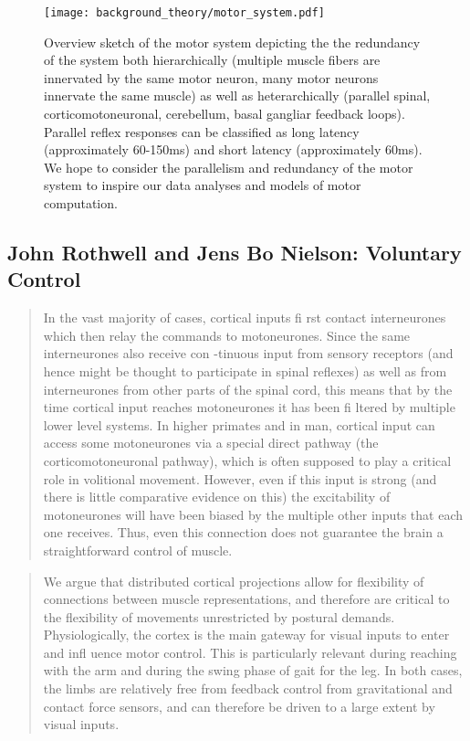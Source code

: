 \documentclass[../main.tex]{subfiles}
\begin{document}
\begin{figure}[H]
\centering
\texttt{[image: background\_theory/motor\_system.pdf]}
\caption[Motor sytem schematic]{Overview sketch of the motor system depicting the the redundancy of the system both hierarchically (multiple muscle fibers are innervated by the same motor neuron, many motor neurons innervate the same muscle) as well as heterarchically (parallel spinal, corticomotoneuronal, cerebellum, basal gangliar feedback loops). Parallel reflex responses can be classified as long latency (approximately 60-150ms) and short latency (approximately 60ms). We hope to consider the parallelism and redundancy of the motor system to inspire our data analyses and models of motor computation.}\label{fig:motor_system}
\end{figure}

\subsection{John Rothwell and Jens Bo Nielson: Voluntary Control}\label{john-rothwell-and-jens-bo-nielson-voluntary-control}

\begin{quote}
In the vast majority of cases, cortical inputs fi rst contact interneurones which then relay the commands to motoneurones. Since the same interneurones also receive con -tinuous input from sensory receptors (and hence might be thought to participate in spinal reflexes) as well as from interneurones from other parts of the spinal cord, this means that by the time cortical input reaches motoneurones it has been fi ltered by multiple lower level systems. In higher primates and in man, cortical input can access some motoneurones via a special direct pathway (the corticomotoneuronal pathway), which is often supposed to play a critical role in volitional movement. However, even if this input is strong (and there is little comparative evidence on this) the excitability of motoneurones will have been biased by the multiple other inputs that each one receives. Thus, even this connection does not guarantee the brain a straightforward control of muscle.
\end{quote}

\begin{quote}
We argue that distributed cortical projections allow for flexibility of connections between muscle representations, and therefore are critical to the flexibility of movements unrestricted by postural demands. Physiologically, the cortex is the main gateway for visual inputs to enter and infl uence motor control. This is particularly relevant during reaching with the arm and during the swing phase of gait for the leg. In both cases, the limbs are relatively free from feedback control from gravitational and contact force sensors, and can therefore be driven to a large extent by visual inputs.
\end{quote}
\end{document}
